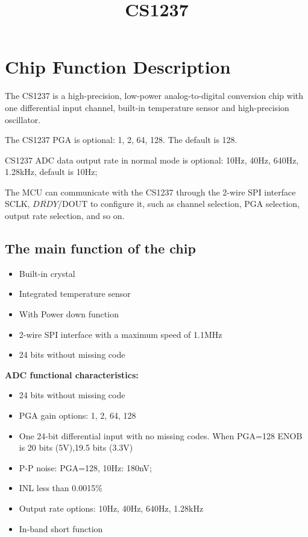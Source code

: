 \documentclass{article}
\title{CS1237}
\begin{document}
\maketitle

\section{Chip Function Description}

The CS1237 is a high-precision, low-power analog-to-digital conversion chip with one differential 
input channel, built-in temperature sensor and high-precision oscillator.

The CS1237 PGA is optional: 1, 2, 64, 128. The default is 128.

CS1237 ADC data output rate in normal mode is optional: 10Hz, 40Hz, 640Hz, 1.28kHz, default is 10Hz;

The MCU can communicate with the CS1237 through the 2-wire SPI interface SCLK, $\overline{DRDY}$/DOUT to configure it, such as channel selection, PGA selection, output rate selection, and so on.

\subsection{The main function of the chip}

\begin{itemize}
    \item Built-in crystal
    \item Integrated temperature sensor
    \item With Power down function
    \item 2-wire SPI interface with a maximum speed of 1.1MHz

    \item 24 bits without missing code
\end{itemize}

\textbf{ADC functional characteristics:}

\begin{itemize}
    \item 24 bits without missing code
    \item PGA gain options: 1, 2, 64, 128
    \item One 24-bit differential input with no missing codes. When PGA=128 ENOB is 20 bits (5V),19.5 bits (3.3V)
    \item P-P noise: PGA=128, 10Hz: 180nV;
    \item INL less than 0.0015\%
    \item Output rate options: 10Hz, 40Hz, 640Hz, 1.28kHz
    \item In-band short function
\end{itemize}
\end{document}
